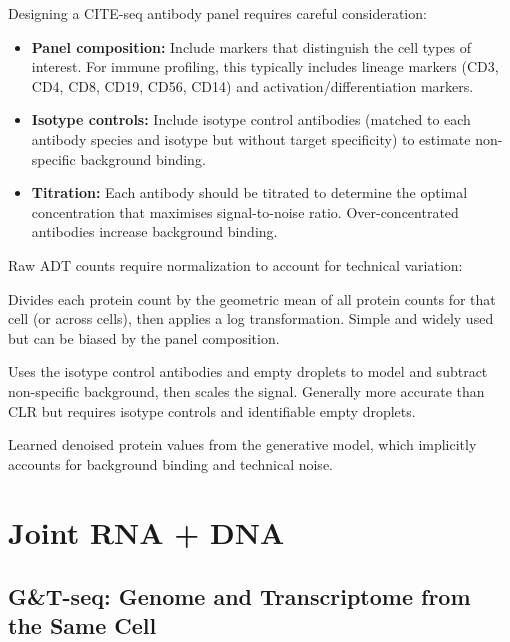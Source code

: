 Designing a CITE-seq antibody panel requires careful consideration:

\begin{itemize}[itemsep=3pt]
  \item \textbf{Panel composition:} Include markers that distinguish the cell types of interest. For immune profiling, this typically includes lineage markers (CD3, CD4, CD8, CD19, CD56, CD14) and activation/differentiation markers.
  \item \textbf{Isotype controls:} Include isotype control antibodies (matched to each antibody species and isotype but without target specificity) to estimate non-specific background binding.
  \item \textbf{Titration:} Each antibody should be titrated to determine the optimal concentration that maximises signal-to-noise ratio. Over-concentrated antibodies increase background binding.
\end{itemize}

\begin{tipbox}[title={Protein Normalization Methods}]
Raw ADT counts require normalization to account for technical variation:
\begin{description}[style=nextline, itemsep=2pt]
  \item[CLR (Centered Log-Ratio)] Divides each protein count by the geometric mean of all protein counts for that cell (or across cells), then applies a log transformation. Simple and widely used but can be biased by the panel composition.
  \item[DSB (Denoised and Scaled by Background)] Uses the isotype control antibodies and empty droplets to model and subtract non-specific background, then scales the signal. Generally more accurate than CLR but requires isotype controls and identifiable empty droplets.
  \item[TotalVI normalization] Learned denoised protein values from the generative model, which implicitly accounts for background binding and technical noise.
\end{description}
\end{tipbox}


\section{Joint RNA + DNA}
\label{sec:multiomics:rna-dna}

\subsection{G\&T-seq: Genome and Transcriptome from the Same Cell}
\label{subsec:multiomics:gt-seq}

